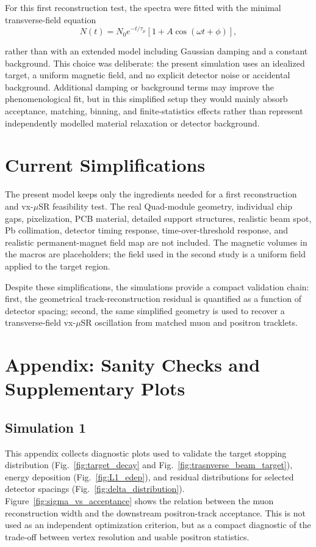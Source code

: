 \documentclass[11pt,a4paper]{article}
\begin{document}
For this first reconstruction test, the spectra were fitted with the minimal transverse-field equation
$$ N(t)=N_0 e^{-t/\tau_\mu} \left[1+A\cos(\omega t+\phi)\right], $$

\noindent rather than with an extended model including Gaussian damping and a constant background. This choice was deliberate: the present simulation uses an idealized target, a uniform magnetic field, and no explicit detector noise or accidental background. Additional damping or background terms may improve the phenomenological fit, but in this simplified setup they would mainly absorb acceptance, matching, binning, and finite-statistics effects rather than represent independently modelled material relaxation or detector background.


\section{Current Simplifications}

The present model keeps only the ingredients needed for a first reconstruction
and vx-$\mu$SR feasibility test. The real Quad-module geometry, individual chip
gaps, pixelization, PCB material, detailed support structures, realistic beam
spot, Pb collimation, detector timing response, time-over-threshold response,
and realistic permanent-magnet field map are not included. The magnetic volumes
in the macros are placeholders; the field used in the second study is a uniform
field applied to the target region.

Despite these simplifications, the simulations provide a compact validation chain: first, the geometrical track-reconstruction residual is quantified as a function of detector spacing; second, the same simplified geometry is used to recover a transverse-field vx-$\mu$SR oscillation from matched muon and positron tracklets.


\FloatBarrier

\appendix
\section{Appendix: Sanity Checks and Supplementary Plots}

\subsection{Simulation 1}
This appendix collects diagnostic plots used to validate the target stopping distribution (Fig.~\ref{fig:target_decay} and Fig.~\ref{fig:trasnverse_beam_target}), energy deposition (Fig.~\ref{fig:L1_edep}), and residual distributions for selected detector spacings (Fig.~\ref{fig:delta_distribution}). Figure~\ref{fig:sigma_vs_acceptance} shows the relation between the muon reconstruction width and the downstream positron-track acceptance. This is not used as an independent optimization criterion, but as a compact diagnostic of the trade-off between vertex resolution and usable positron statistics.
\end{document}
